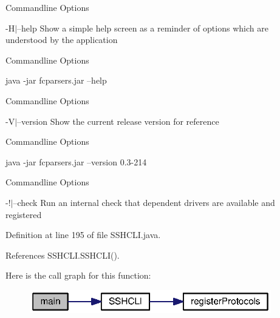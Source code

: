 \begin{DoxyRefDesc}{Commandline Options}
\item[{\bf Commandline Options}]-\/\+H$\vert$--help Show a simple help screen as a reminder of options which are understood by the application \end{DoxyRefDesc}
\begin{DoxyRefDesc}{Commandline Options}
\item[{\bf Commandline Options}]
\begin{DoxyCode}
java -jar fcparsers.jar --help 
\end{DoxyCode}
\end{DoxyRefDesc}


\begin{DoxyRefDesc}{Commandline Options}
\item[{\bf Commandline Options}]-\/\+V$\vert$--version Show the current release version for reference \end{DoxyRefDesc}
\begin{DoxyRefDesc}{Commandline Options}
\item[{\bf Commandline Options}]
\begin{DoxyCode}
java -jar fcparsers.jar --version
0.3-214 
\end{DoxyCode}
\end{DoxyRefDesc}


\begin{DoxyRefDesc}{Commandline Options}
\item[{\bf Commandline Options}]-\/!$\vert$--check Run an internal check that dependent drivers are available and registered \end{DoxyRefDesc}


Definition at line 195 of file S\+S\+H\+C\+L\+I.\+java.



References S\+S\+H\+C\+L\+I.\+S\+S\+H\+C\+L\+I().



Here is the call graph for this function\+:\nopagebreak
\begin{figure}[H]
\begin{center}
\leavevmode
\includegraphics[width=298pt]{classorg_1_1smallfoot_1_1parser_1_1SSHCLI_a75988cf84fc6ee7a2ebff36e363021aa_cgraph}
\end{center}
\end{figure}



